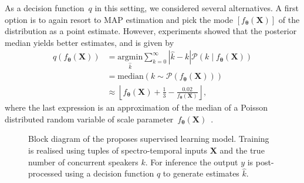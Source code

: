 As a decision function~$q$ in this setting, we considered several alternatives. A first option is to again resort to MAP estimation and pick the mode $\left[f_{\mathbf{\mathbf{\theta}}}\left(\mathbf{X}\right)\right]$ of the distribution as a point estimate. However, experiments showed that the posterior median yields better estimates, and is given by
\begin{subequations}
\begin{align}
q\left(f_{\mathbf{\mathbf{\theta}}}\left(\mathbf{X}\right)\right) & =\underset{\hat{k}}{\text{argmin}}\sum_{k=0}^{\infty}\left|\hat{k}-k\right|\mathcal{P}\left(k\mid f_{\mathbf{\mathbf{\theta}}}\left(\mathbf{X}\right)\right)\\
 & =\text{median}\left(k\sim\mathcal{P}\left(f_{\mathbf{\mathbf{\theta}}}\left(\mathbf{X}\right)\right)\right)\\
 & \approx\left\lfloor f_{\mathbf{\mathbf{\theta}}}\left(\mathbf{X}\right)+\frac{1}{3}-\frac{0.02}{f_{\mathbf{\mathbf{\theta}}}\left(\mathbf{X}\right)}\right\rfloor, \label{eq:decision_function_poisson}
\end{align}
\end{subequations}
where the last expression is an approximation of the median of a Poisson distributed random variable of scale parameter~$f_{\mathbf{\mathbf{\theta}}}\left(\mathbf{X}\right)$~\cite{Choi94}.

\begin{figure}[t]
  \centering
  \begin{adjustbox}{width=1\columnwidth}
    
  \end{adjustbox}
\caption{%
Block diagram of the proposes supervised learning model.
Training is realised using tuples of spectro-temporal inputs \(\mathbf{X}\) and
the true number of concurrent speakers \(k\). For inference the output \(y\) is post-processed using a decision function \(q\) to generate estimates \(\hat{k}\).
}%
\label{fig:blockdiagram}
\end{figure}

